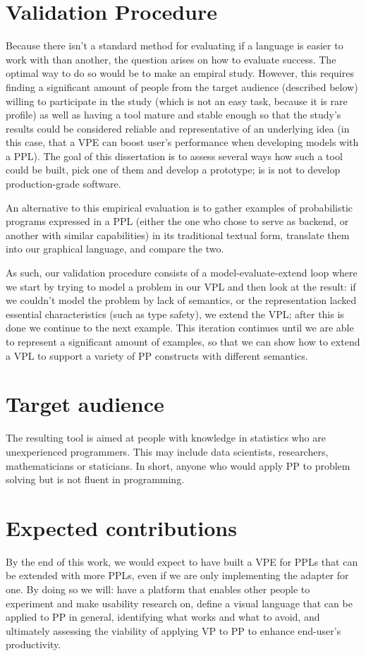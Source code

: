 \section{Validation Procedure}

Because there isn't a standard method for evaluating if a language is easier
to work with than another, the question arises on how to evaluate success.
The optimal way to do so would be to make an empiral
study. However, this requires finding a significant amount of people from the
target audience (described below) willing to participate in the study (which
is not an easy task, because it is rare profile) as well as having a tool mature and stable enough so that the
study's results could be considered reliable and representative of an underlying
idea (in this case, that a VPE can boost user's performance when developing
models with a PPL). The goal of this dissertation is to
assess several ways how such a tool could be built, pick one of them and develop
a prototype; is is not to develop production-grade software.

An alternative to this empirical evaluation is to gather examples of probabilistic programs expressed in a
PPL (either the one who chose to serve as backend, or another with similar
capabilities) in its traditional textual form, translate them into our graphical
language, and compare the two.

As such, our validation procedure consists of a model-evaluate-extend loop where
we start by trying to model a problem in our VPL and then look at the result:
if we couldn't model the problem by lack of semantics, or the representation
lacked essential characteristics (such as type safety), we extend the VPL;
after this is done we continue to the next example. This iteration continues
until we are able to represent a significant amount of examples, so that
we can show how to extend a VPL to support a variety of PP constructs with different
semantics.

\section{Target audience}\label{sec:audience}

The resulting tool is aimed at people with knowledge in statistics
who are unexperienced programmers. This may include data scientists, researchers,
mathematicians or staticians. In short, anyone who would apply PP to problem
solving but is not fluent in programming.

\section{Expected contributions}

By the end of this work, we would expect to have built a VPE for PPLs that can
be extended with more PPLs, even if we are only implementing the adapter for one.
By doing so we will: have a platform that enables other people to experiment
and make usability research on, define a visual language that can be applied to PP in general,
identifying what works and what to avoid,
and ultimately assessing the viability of applying VP to PP to enhance end-user's
productivity.
